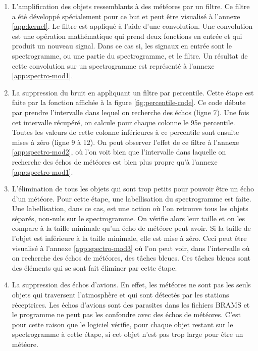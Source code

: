 \documentclass[11pt]{article}
\begin{document}
\begin{enumerate}
    \item L'amplification des objets ressemblants à des météores par un filtre.
          Ce filtre a été développé spécialement pour ce but et peut être visualisé à l'annexe \ref{app:kernel}.
          Le filtre est appliqué à l'aide d'une convolution.
          Une convolution est une opération mathématique qui prend deux fonctions en entrée et qui produit un nouveau signal.
          Dans ce cas si, les signaux en entrée sont le spectrogramme, ou une partie du spectrogramme, et le filtre.
          Un résultat de cette convolution sur un spectrogramme est représenté à l'annexe \ref{app:spectro-mod1}.
    \item La suppression du bruit en appliquant un filtre par percentile.
          Cette étape est faite par la fonction affichée à la figure \ref{fig:percentile-code}.
          Ce code débute par prendre l'intervalle dans lequel on recherche des échos (ligne 7).
          Une fois cet intervalle récupéré, on calcule pour chaque colonne le 95e percentile.
          Toutes les valeurs de cette colonne inférieures à ce percentile sont ensuite mises à zéro (ligne 9 à 12).
          On peut observer l'effet de ce filtre à l'annexe \ref{app:spectro-mod2}, où l'on voit bien que l'intervalle dans laquelle on recherche des échos de météores est bien plus propre qu'à l'annexe \ref{app:spectro-mod1}.
    \item L'élimination de tous les objets qui sont trop petits pour pouvoir être un écho d'un météore.
          Pour cette étape, une labellisation du spectrogramme est faite.
          Une labellisation, dans ce cas, est une action où l'on retrouve tous les objets séparés, non-nuls sur le spectrogramme.
          On vérifie alors leur taille et on les compare à la taille minimale qu'un écho de météore peut avoir.
          Si la taille de l'objet est inférieure à la taille minimale, elle est mise à zéro.
          Ceci peut être visualisé à l'annexe \ref{app:spectro-mod3} où l'on peut voir, dans l'intervalle où on recherche des échos de météores, des tâches bleues.
          Ces tâches bleues sont des éléments qui se sont fait éliminer par cette étape.
    \item La suppression des échos d'avions.
          En effet, les météores ne sont pas les seuls objets qui traversent l'atmosphère et qui sont détectés par les stations réceptrices.
          Les échos d'avions sont des parasites dans les fichiers BRAMS et le programme ne peut pas les confondre avec des échos de météores.
          C'est pour cette raison que le logiciel vérifie, pour chaque objet restant sur le spectrogramme à cette étape, si cet objet n'est pas trop large pour être un météore.
\end{enumerate}
\end{document}

